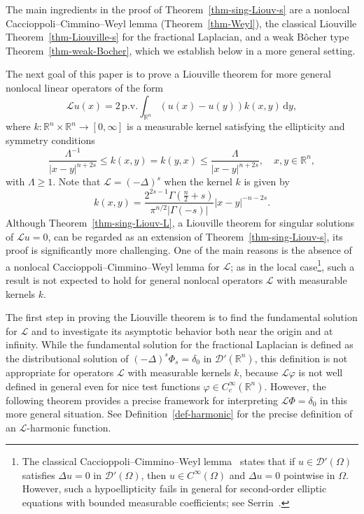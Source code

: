 \documentclass[11pt]{amsart}
\theoremstyle{plain}
\theoremstyle{definition}
\numberwithin{equation}{section}
\begin{document}
The main ingredients in the proof of Theorem~\ref{thm-sing-Liouv-s} are a nonlocal Caccioppoli--Cimmino--Weyl lemma (Theorem~\ref{thm-Weyl}), the classical Liouville Theorem~\ref{thm-Liouville-s} for the fractional Laplacian, and a weak B\^ocher type Theorem~\ref{thm-weak-Bocher}, which we establish below in a more general setting.

The next goal of this paper is to prove a Liouville theorem for more general nonlocal linear operators of the form
\begin{equation}\label{eq-L}
\mathcal{L}u(x) = 2\,\mathrm{p.v.} \int_{\mathbb{R}^n} (u(x)-u(y)) k(x, y)\,\mathrm{d}y,
\end{equation}
where $k: \mathbb{R}^n \times \mathbb{R}^n \to [0, \infty]$ is a measurable kernel satisfying the ellipticity and symmetry conditions
\begin{equation*}
\frac{\Lambda^{-1}}{|x-y|^{n+2s}} \leq k(x, y) = k(y, x) \leq \frac{\Lambda}{|x-y|^{n+2s}}, \quad x, y \in \mathbb{R}^n,
\end{equation*}
with $\Lambda \geq 1$. Note that $\mathcal{L}=(-\Delta)^s$ when the kernel $k$ is given by
\begin{equation*}
k(x, y) = \frac{2^{2s-1}\Gamma(\frac{n}{2}+s)}{\pi^{n/2}|\Gamma(-s)|}|x-y|^{-n-2s}.
\end{equation*}
Although Theorem~\ref{thm-sing-Liouv-L}, a Liouville theorem for singular solutions of $\mathcal{L}u=0$, can be regarded as an extension of Theorem~\ref{thm-sing-Liouv-s}, its proof is significantly more challenging. One of the main reasons is the absence of a nonlocal Caccioppoli--Cimmino--Weyl lemma for $\mathcal{L}$; as in the local case\footnote{The classical Caccioppoli--Cimmino--Weyl lemma~\cite{Cac38,Cim37,Cim38,Wey40} states that if $u \in \mathscr{D}'(\Omega)$ satisfies $\Delta u=0$ in $\mathscr{D}'(\Omega)$, then $u \in C^\infty(\Omega)$ and $\Delta u=0$ pointwise in $\Omega$. However, such a hypoellipticity fails in general for second-order elliptic equations with bounded measurable coefficients; see Serrin~\cite{Ser64b}.}, such a result is not expected to hold for general nonlocal operators $\mathcal{L}$ with measurable kernels $k$.

The first step in proving the Liouville theorem is to find the fundamental solution for $\mathcal{L}$ and to investigate its asymptotic behavior both near the origin and at infinity. While the fundamental solution for the fractional Laplacian is defined as the distributional solution of $(-\Delta)^s \Phi_s = \delta_0$ in $\mathscr{D}'(\mathbb{R}^n)$, this definition is not appropriate for operators $\mathcal{L}$ with measurable kernels $k$, because $\mathcal{L}\varphi$ is not well defined in general even for nice test functions $\varphi \in C^\infty_c(\mathbb{R}^n)$. However, the following theorem provides a precise framework for interpreting $\mathcal{L}\Phi=\delta_0$ in this more general situation. See Definition~\ref{def-harmonic} for the precise definition of an $\mathcal{L}$-harmonic function.
\end{document}
